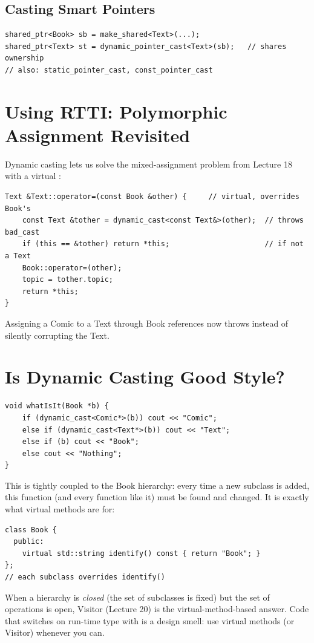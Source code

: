 \subsection{Casting Smart Pointers}
\begin{lstlisting}[style=cpp]
shared_ptr<Book> sb = make_shared<Text>(...);
shared_ptr<Text> st = dynamic_pointer_cast<Text>(sb);   // shares ownership
// also: static_pointer_cast, const_pointer_cast
\end{lstlisting}

\section{Using RTTI: Polymorphic Assignment Revisited}
Dynamic casting lets us solve the mixed-assignment problem from Lecture 18 with a
virtual :
\begin{lstlisting}[style=cpp]
Text &Text::operator=(const Book &other) {     // virtual, overrides Book's
    const Text &tother = dynamic_cast<const Text&>(other);  // throws bad_cast
    if (this == &tother) return *this;                      // if not a Text
    Book::operator=(other);
    topic = tother.topic;
    return *this;
}
\end{lstlisting}
Assigning a Comic to a Text through Book references now throws instead of
silently corrupting the Text.

\section{Is Dynamic Casting Good Style?}
\begin{lstlisting}[style=cpp]
void whatIsIt(Book *b) {
    if (dynamic_cast<Comic*>(b)) cout << "Comic";
    else if (dynamic_cast<Text*>(b)) cout << "Text";
    else if (b) cout << "Book";
    else cout << "Nothing";
}
\end{lstlisting}
This is tightly coupled to the Book hierarchy: every time a new subclass is
added, this function (and every function like it) must be found and changed. It
is exactly what virtual methods are for:
\begin{lstlisting}[style=cpp]
class Book {
  public:
    virtual std::string identify() const { return "Book"; }
};
// each subclass overrides identify()
\end{lstlisting}
When a hierarchy is \emph{closed} (the set of subclasses is fixed) but the set of
operations is open, Visitor (Lecture 20) is the virtual-method-based answer.
Code that switches on run-time type with  is a design smell:
use virtual methods (or Visitor) whenever you can.

